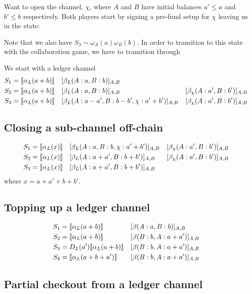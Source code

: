 Want to open the channel, $\chi$, where $A$ and $B$ have initial balances $a' \leq a$ and $b' \leq b$ respectively. Both players start by signing a pre-fund setup for $\chi$ leaving us in the state:

Note that we also have $S_3 \sim \omega_A(a)\omega_B(b)$. In order to transition to this state with the collaboration game, we have to transition through 

We start with a ledger channel 
\begin{align*}
S_1 &= \llbracket \alpha_L(a+b) \rrbracket &&[\beta_L(A: a, B: b)]_{A, B} & \\
S_2 &= \llbracket \alpha_L(a+b) \rrbracket &&[\beta_L(A: a, B: b)]_{A, B}&[\beta_\chi(A: a', B: b')]_{A, B} \\
S_3 &= \llbracket \alpha_L(a+b) \rrbracket &&[\beta_L(A: a-a', B: b-b', \chi: a' + b')]_{A, B}&[\beta_\chi(A: a', B: b')]_{A, B}
\end{align*}

\subsection{Closing a sub-channel off-chain}

\begin{align*}
S_1 &= \llbracket \alpha_L(x) \rrbracket &&[\beta_L(A: a, B: b, \chi: a' + b')]_{A, B}&[\beta_\chi(A: a', B: b')]_{A, B}\\
S_2 &= \llbracket \alpha_L(x) \rrbracket &&[\beta_L(A: a + a', B: b + b')]_{A, B}&[\beta_\chi(A: a', B: b')]_{A, B} \\
S_3 &= \llbracket \alpha_L(x) \rrbracket &&[\beta_L(A: a + a', B: b + b')]_{A, B} & 
\end{align*}
where $x = a + a' + b + b'$.

\subsection{Topping up a ledger channel}

\begin{align*}
S_1 &= \llbracket \alpha_L(a + b) \rrbracket &&[\beta(A: a, B: b)]_{A, B} \\
S_2 &= \llbracket \alpha_L(a + b) \rrbracket &&[\beta(B: b, A: a + a')]_{A, B} \\
S_3 &= D_L(a')\llbracket \alpha_L(a + b) \rrbracket &&[\beta(B: b, A: a + a')]_{A, B} \\
S_4 &= \llbracket \alpha_L(a + b + a') \rrbracket &&[\beta(B: b, A: a + a')]_{A, B}
\end{align*}

\subsection{Partial checkout from a ledger channel}

